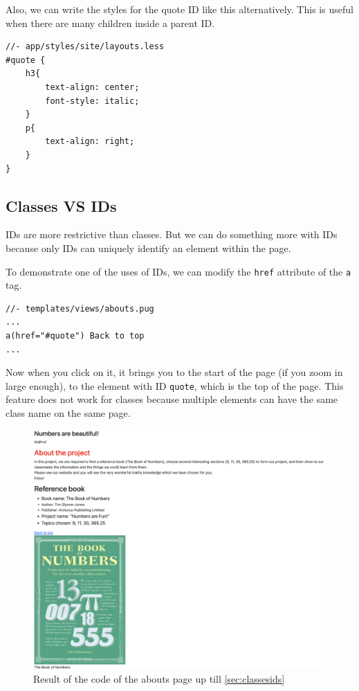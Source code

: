 Also, we can write the styles for the quote ID like this alternatively. This is useful when there are many children inside a parent ID.
\vspace{6mm}

\begin{lstlisting}[language=pug]
//- app/styles/site/layouts.less
#quote {
    h3{
        text-align: center;
        font-style: italic;
    }
    p{
        text-align: right;
    }
}
\end{lstlisting}
\vspace{6mm}

\subsection*{Classes VS IDs}
\label{sec:vsclassesids}

IDs are more restrictive than classes. But we can do something more with IDs because only IDs can uniquely identify an element within the page.

To demonstrate one of the uses of IDs, we can modify the \texttt{href} attribute of the \texttt{a} tag. 

\begin{lstlisting}[language=pug]
//- templates/views/abouts.pug
...
a(href="#quote") Back to top
...
\end{lstlisting}

Now when you click on it, it brings you to the start of the page (if you zoom in large enough), to the element with ID \texttt{quote}, which is the top of the page. This feature does not work for classes because multiple elements can have the same class name on the same page.

\begin{figure}[h]
\centering
\includegraphics[width=15cm]{images/chn2-abouts-styled.png}
\caption{Result of the code of the abouts page up till \cref{sec:classesids}}
\label{fig:aboutspage}
\end{figure}

